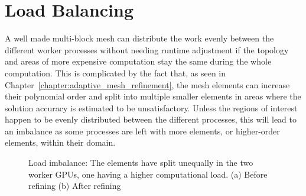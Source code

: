 \chapter{Load Balancing} \label{chapter:load_balancing}

A well made multi-block mesh can distribute the work evenly between the different worker processes
without needing runtime adjustment if the topology and areas of more expensive computation stay the
same during the whole computation. This is complicated by the fact that, as seen in
Chapter~\ref{chapter:adaptive_mesh_refinement}, the mesh elements can increase their polynomial
order and split into multiple smaller elements in areas where the solution accuracy is estimated to
be unsatisfactory. Unless the regions of interest happen to be evenly distributed between the
different processes, this will lead to an imbalance as some processes are left with more elements,
or higher-order elements, within their domain.

\begin{figure}[H]
	\centering
	\hfill
	\caption{Load imbalance: The elements have split unequally in the two worker GPUs, one having a higher computational load. (a) Before refining (b) After refining}
	\label{fig:load_imbalance_lb}
\end{figure}

